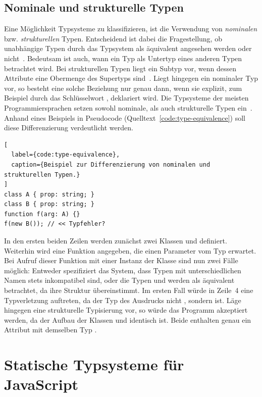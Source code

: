 \subsection{Nominale und strukturelle Typen}
Eine Möglichkeit Typsysteme zu klassifizieren, ist die Verwendung von \textit{nominalen} bzw. \textit{strukturellen} Typen. Entscheidend ist dabei die Fragestellung, ob unabhängige Typen durch das Typsystem als äquivalent angesehen werden oder nicht~\autocite[9]{CARDELLI:TYPE_SYSTEMS}. Bedeutsam ist auch, wann ein Typ als Untertyp eines anderen Typen betrachtet wird. Bei strukturellen Typen liegt ein Subtyp vor, wenn dessen Attribute eine Obermenge des Supertyps sind~\autocite{MALAYERI:2008}. Liegt hingegen ein nominaler Typ vor, so besteht eine solche Beziehung nur genau dann, wenn sie explizit, zum Beispiel durch das Schlüsselwort , deklariert wird. Die Typsysteme der meisten Programmiersprachen setzen sowohl nominale, als auch strukturelle Typen ein~\autocite[9]{CARDELLI:TYPE_SYSTEMS}. Anhand eines Beispiels in Pseudocode (Quelltext~\ref{code:type-equivalence}) soll diese Differenzierung verdeutlicht werden.

\begin{lstlisting}[
  label={code:type-equivalence},
  caption={Beispiel zur Differenzierung von nominalen und strukturellen Typen.}
]
class A { prop: string; }
class B { prop: string; }
function f(arg: A) {}
f(new B()); // << Typfehler?
\end{lstlisting}

In den ersten beiden Zeilen werden zunächst zwei Klassen  und  definiert. Weiterhin wird eine Funktion  angegeben, die einen Parameter vom Typ  erwartet. Bei Aufruf dieser Funktion mit einer Instanz der Klasse  sind nun zwei Fälle möglich: Entweder spezifiziert das System, dass Typen mit unterschiedlichen Namen stets inkompatibel sind, oder die Typen  und  werden als äquivalent betrachtet, da ihre Struktur übereinstimmt. Im ersten Fall würde in Zeile~4 eine Typverletzung auftreten, da der Typ des Ausdrucks  nicht , sondern  ist. Läge hingegen eine strukturelle Typisierung vor, so würde das Programm akzeptiert werden, da der Aufbau der Klassen  und  identisch ist. Beide enthalten genau ein Attribut  mit demselben Typ .

\section{Statische Typsysteme für JavaScript}
\label{sec:static-typesystems-for-js}

